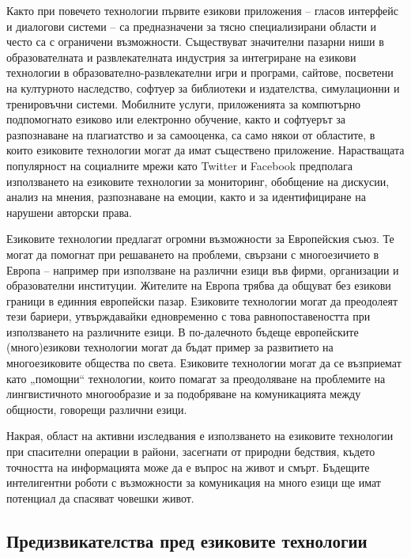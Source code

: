 \documentclass[]{../../metanetpaper}
\begin{document}
\begin{multicols}{2}
Както при повечето технологии първите езикови приложения -- гласов
 интерфейс и диалогови системи -- са предназначени за тясно специализирани области и често са с ограничени възможности. 
 Съществуват значителни пазарни ниши в образователната и развлекателната индустрия за интегриране на  езикови технологии в образователно-развлекателни  игри и програми, сайтове, посветени на културното наследство, софтуер за библиотеки и издателства, симулационни и тренировъчни системи. 
Мобилните услуги, приложенията за компютърно подпомогнато езиково или електронно обучение, както и софтуерът за разпознаване
 на плагиатство и за самооценка, са само някои от областите, в които езиковите технологии могат да имат съществено приложение. Нарастващата популярност на социалните мрежи като Twitter и Facebook предполага използването на езиковите технологии за мониторинг, обобщение на дискусии, анализ на мнения, разпознаване на емоции, както и за идентифициране на нарушени авторски права.


Езиковите технологии предлагат огромни възможности за Европейския
 съюз. Те могат да помогнат при решаването на проблеми, свързани с многоезичието в Европа – например при използване на различни езици във фирми, организации и образователни институции. Жителите на Европа трябва  да общуват без езикови граници в единния европейски пазар.  Езиковите технологии могат да преодолеят тези бариери, утвърждавайки едновременно с това равнопоставеността при използването на различните езици. 
В по-далечното бъдеще европейските (много)езикови технологии могат да бъдат пример за развитието на многоезиковите общества по света.
 Езиковите технологии могат да се възприемат като „помощни“ технологии, които помагат за преодоляване на проблемите на лингвистичното многообразие и за подобряване на комуникацията между общности, говорещи различни езици.

Накрая, област на активни изследвания е използването на езиковите технологии при спасителни операции в райони, засегнати от природни бедствия, където
 точността на информацията може да е въпрос на живот и смърт. Бъдещите интелигентни роботи с възможности за комуникация на много езици ще имат потенциал да спасяват човешки живот.

\subsection{Предизвикателства пред езиковите технологии}


\end{multicols}
\end{document}
